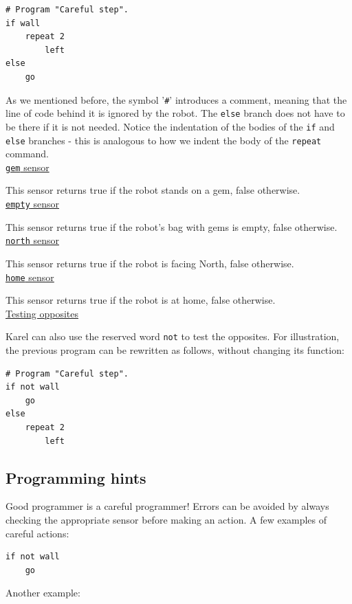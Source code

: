 \begin{verbatim}
# Program "Careful step".
if wall
    repeat 2
        left
else
    go
\end{verbatim}
As we mentioned before, the symbol '{\tt \#}' introduces a comment, meaning that the line 
of code behind it is ignored by the robot.
The {\tt else} branch does not have to be there if it is not needed. Notice the indentation 
of the bodies of the {\tt if} and {\tt else} branches - this is analogous 
to how we indent the body of the {\tt repeat} command.\\

\noindent
\underline{{\tt gem} sensor}

This sensor returns true if the robot stands on a gem, false otherwise. \\

\noindent
\underline{{\tt empty} sensor}

This sensor returns true if the robot's bag with gems is empty, false otherwise. \\

\noindent
\underline{{\tt north} sensor}

This sensor returns true if the robot is facing North, false otherwise.\\

\noindent
\underline{{\tt home} sensor}

This sensor returns true if the robot is at home, false otherwise.\\

\noindent
\underline{Testing opposites}

Karel can also use the reserved word {\tt not} to test the opposites.
For illustration, the previous program can be rewritten as follows, without 
changing its function:
\begin{verbatim}
# Program "Careful step".
if not wall
    go
else
    repeat 2
        left
\end{verbatim}

\subsection{Programming hints}

Good programmer is a careful programmer! Errors can be avoided by always checking the 
appropriate sensor before making an action. A few examples of careful actions:
 
\begin{verbatim}
if not wall
    go
\end{verbatim}
Another example:
 
